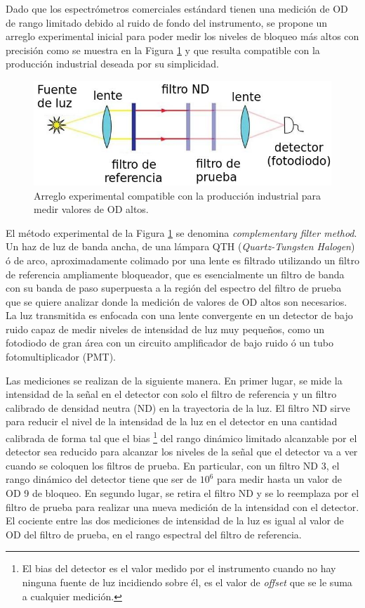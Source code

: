 Dado que los espectrómetros 
comerciales estándard tienen una medición de OD de rango limitado debido al 
ruido de fondo del instrumento, se propone un arreglo experimental inicial para 
poder medir los niveles de bloqueo más altos con precisión como se muestra en 
la Figura \ref{fig:su} y que resulta compatible con la producción industrial 
deseada por su simplicidad.


\begin{figure}[h!]
	\centering
	\includegraphics[scale=1.0]{Figs/plan_de_tesis/setup_u.jpeg}
	\caption{Arreglo experimental compatible con la producción industrial para 
	medir valores de 
	OD altos.}
	\label{fig:su}
\end{figure}

El método experimental de la Figura \ref{fig:su} se denomina 
\textit{complementary filter method}. Un haz de 
luz de banda ancha, de una lámpara QTH 
(\textit{Quartz-Tungsten Halogen}) ó de arco, aproximadamente colimado por una 
lente  es filtrado utilizando un filtro 
de referencia ampliamente bloqueador, que es esencialmente un filtro de banda 
con su banda de paso superpuesta a la región del espectro del filtro de prueba 
que se quiere analizar donde la medición de valores de OD altos son necesarios. 
La luz transmitida es enfocada con una lente convergente en un detector de bajo 
ruido capaz de medir niveles de intensidad de luz muy pequeños, como un 
fotodiodo de gran área con un circuito amplificador de bajo ruido ó un tubo 
fotomultiplicador (PMT).


Las mediciones se realizan de la siguiente manera. En primer lugar, se mide la 
intensidad de la señal en el detector con solo el filtro de referencia y un 
filtro calibrado de densidad neutra (ND) en la trayectoria de la luz. El filtro 
ND sirve para reducir el nivel de la intensidad de la luz en el detector en 
una cantidad calibrada de forma tal que el bias \footnote{El bias del 
detector es el valor medido por el instrumento cuando no hay ninguna fuente 
de luz incidiendo sobre él, es el valor de \textit{offset} que se le suma a 
cualquier 
medición.} del rango 
dinámico limitado alcanzable por el detector sea reducido para alcanzar los 
niveles de la señal que el detector va a ver cuando se coloquen los filtros de 
prueba. En particular, con un filtro ND 3, el rango dinámico del detector tiene 
que ser de $10^{6}$ para medir hasta un valor de OD 9 de bloqueo. En segundo 
lugar, se retira el filtro ND y se lo reemplaza por el filtro de prueba para 
realizar una nueva medición de la intensidad con el detector. El cociente entre 
las dos mediciones de intensidad de la luz es igual al valor de OD del filtro 
de prueba, en el rango espectral del filtro de referencia.


